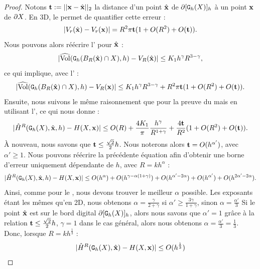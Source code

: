 %
\begin{proof}
%
Notons $\vt \EqDef ||\vx-\vxH||_2$ la distance d'un point $\vxH$ de
$\Bd{\Body{\DSh}{h}}$ à un point $\vx$ de $\dS$. En 3D, le
 permet de quantifier cette erreur :
%
\begin{equation}\label{eq:volume-shift-error}
  | V_r(\vxH) - V_r(\vx) | = R^2 \pi \vt (1 + O(R^2)+O(\vt)).
\end{equation}
%
Nous pouvons alors réécrire l'
pour $\vxH$ :
%
\begin{equation}
  | \VolC(\DigF{\Ball{R}{\vxH} \cap \Shape}{h}, h) - V_R(\vxH) | \le K_1 h^\gamma R^{3-\gamma},
\end{equation}
%
ce qui implique, avec l' :
%
\begin{equation}\label{eq:shift-B-R-error-bound-3D}
  | \VolC(\DigF{\Ball{R}{\vxH} \cap \Shape}{h}, h) - V_R(\vx) |  \le K_1 h^\gamma R^{3-\gamma} +  R^2 \pi \vt (1 + O(R^2) + O(\vt)).
\end{equation}
%
Ensuite, nous suivons le même raisonnement que pour la preuve du
 mais en utilisant
l', ce qui nous donne :
%
\begin{equation}\label{eq:shift-curvhat-error-bound-3D}
  | \MeanCurvH{R}(\DSh,\vxH,h) - \MeanCurv(\Shape,\vx) | \le O(R) + \frac{4 K_1}{\pi} \frac{h^\gamma}{R^{1+\gamma}} + \frac{4 \vt}{R^2}(1 + O(R^2) + O(\vt)).
\end{equation}
%
À nouveau, nous savons que $\vt \le \frac{\sqrt{2}}{2}h$. Nous noterons alors
$\vt = O(h^{\alpha'})$, avec $\alpha' \ge 1$. Nous pouvons réécrire la
précédente équation afin d'obtenir une borne d'erreur uniquement dépendante de
$h$, avec $R=kh^{\alpha}$ :
%
\begin{equation} \label{eq:shift-meancurvhat-error-bound-h-only}
  | \MeanCurvH{R}(\DSh,\vxH,h) - \MeanCurv(\Shape,\vx) |
  \le O(h^\alpha) + O(h^{\gamma-\alpha(1+\gamma)}) + O(h^{\alpha'-2\alpha})
    + O(h^{\alpha'}) + O(h^{2\alpha'-2\alpha}).
\end{equation}
%
Ainsi, comme pour le , nous devons trouver
le meilleur $\alpha$ possible. Les exposants étant les mêmes qu'en 2D, nous
obtenons $\alpha = \frac{\gamma}{2 + \gamma}$ si $\alpha' \ge \frac{3 \gamma}{1 +
\gamma}$, sinon $\alpha = \frac{\alpha'}{3}$
%
Si le point $\vxH$ est sur le bord digital $\Bd{\Body{\DSh}{h}}$, alors nous
savons que $\alpha'=1$ grâce à la relation $\vt \le \frac{\sqrt{2}}{2}h$, $\gamma =
1$ dans le cas général, alors nous obtenons $\alpha = \frac{\alpha'}{3} =
\frac{1}{3}$. Donc, lorsque $R = kh^{\frac{1}{3}}$ :
%
\begin{equation}
  | \MeanCurvH{R}(\DSh,\vxH) - \MeanCurv(\Shape,\vx) | \le O(h^{\frac{1}{3}})
\end{equation}
%
\end{proof}
%
%
